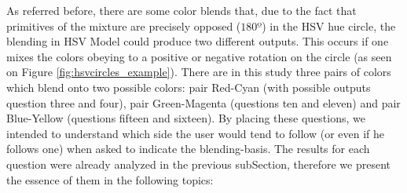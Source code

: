 %
As referred before, there are some color blends that, due to the fact that primitives of the mixture are precisely opposed ($180º$) in the HSV hue circle, the blending in HSV Model could produce two different outputs.
This occurs if one mixes the colors obeying to a positive or negative rotation on the circle (as seen on Figure \ref{fig:hsvcircles_example}). There are in this study three pairs of colors which blend onto two possible
colors: pair Red-Cyan (with possible outputs question three and four), pair Green-Magenta (questions ten and eleven) and pair Blue-Yellow (questions fifteen and sixteen). By placing these questions, we intended to
understand which side the user would tend to follow (or even if he follows one) when asked to indicate the blending-basis. The results for each question were already analyzed in the previous subSection, therefore we
present the essence of them in the following topics:
%
